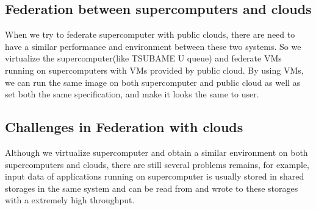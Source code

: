 \subsection{Federation between supercomputers and clouds}
When we try to federate supercomputer with public clouds, there are need to have a similar performance and environment between these two systems.
So we virtualize the supercomputer(like TSUBAME U queue) and federate VMs running on supercomputers with VMs provided by public cloud.
By using VMs, we can run the same image on both supercomputer and public cloud as well as set both the same specification, and make it looks the same to user.%
\subsection{Challenges in Federation with clouds}
\label{sec:problems}
Although we virtualize supercomputer and obtain a similar environment on both supercomputers and clouds, there are still several problems remains, for example, input data of applications running on supercomputer is usually stored in shared storages in the same system and can be read from and wrote to these storages with a extremely high throughput.

